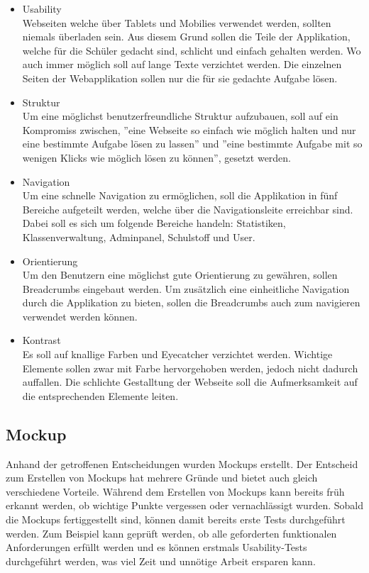 \begin{itemize}
	\item Usability \\
		Webseiten welche über Tablets und Mobilies verwendet werden, sollten niemals überladen sein. Aus diesem Grund sollen die Teile der Applikation, welche für die Schüler gedacht sind, schlicht und einfach gehalten werden. Wo auch immer möglich soll auf lange Texte verzichtet werden. Die einzelnen Seiten der Webapplikation sollen nur die für sie gedachte Aufgabe lösen.
		
		
	\item Struktur \\
		Um eine möglichst benutzerfreundliche Struktur aufzubauen, soll auf ein Kompromiss zwischen, ''eine Webseite so einfach wie möglich halten und nur eine bestimmte Aufgabe lösen zu lassen'' und ''eine bestimmte Aufgabe mit so wenigen Klicks wie möglich lösen zu können'', gesetzt werden. \\
		
	\item Navigation \\
		Um eine schnelle Navigation zu ermöglichen, soll die Applikation in fünf Bereiche aufgeteilt werden, welche über die Navigationsleite erreichbar sind. Dabei soll es sich um folgende Bereiche handeln: Statistiken, Klassenverwaltung, Adminpanel, Schulstoff und User. 
		
	\item Orientierung \\
		Um den Benutzern eine möglichst gute Orientierung zu gewähren, sollen Breadcrumbs eingebaut werden. Um zusätzlich eine einheitliche Navigation durch die Applikation zu bieten, sollen die Breadcrumbs auch zum navigieren verwendet werden können.
		
	\item Kontrast \\
		Es soll auf knallige Farben und Eye­cat­cher verzichtet werden. Wichtige Elemente sollen zwar mit Farbe hervorgehoben werden, jedoch nicht dadurch auffallen. Die schlichte Gestalltung der Webseite soll die Aufmerksamkeit auf die entsprechenden Elemente leiten.
\end{itemize}


\subsection{Mockup}
Anhand der getroffenen Entscheidungen wurden Mockups erstellt. Der Entscheid zum Erstellen von Mockups hat mehrere Gründe und bietet auch gleich verschiedene Vorteile. Während dem Erstellen von Mockups kann bereits früh erkannt werden, ob wichtige Punkte vergessen oder vernachlässigt wurden. Sobald die Mockups fertiggestellt sind, können damit bereits erste Tests durchgeführt werden. Zum Beispiel kann geprüft werden, ob alle geforderten funktionalen Anforderungen erfüllt werden und es können erstmals Usability-Tests durchgeführt werden, was viel Zeit und unnötige Arbeit ersparen kann. \\

